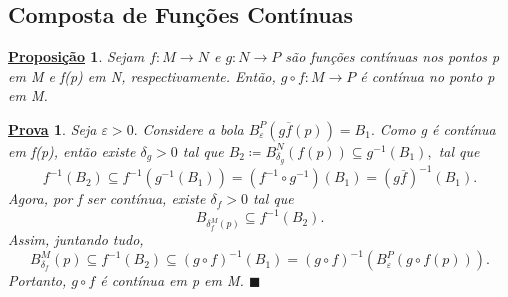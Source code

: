 \documentclass{article}
\newtheorem*{prop*}{\underline{Proposi\c c\~ao}}
\newtheorem*{proof*}{\underline{Prova}}
\renewcommand\qedsymbol{$\blacksquare$}
\begin{document}
\subsection{Composta de Funções Contínuas}
 \begin{prop*}
   Sejam \(f:M\rightarrow N\) e \(g:N\rightarrow P\) são funções contínuas nos pontos p em M e f(p) em N,
respectivamente. Então, \(g\circ{f}:M\rightarrow P\) é contínua no ponto p em M.
 \end{prop*}
 \begin{proof*}
   Seja \(\varepsilon >0.\) Considere a bola \(B_{\varepsilon }^{P}(g\overline{f}(p)) = B_{1}.\) Como g é contínua em f(p), então
existe \(\delta_{g}>0\) tal que \(B_{2}\coloneqq B_{\delta_{g}}^{N}(f(p))\subseteq{g^{-1}(B_{1}),}\) tal que 
  \[
    f^{-1}(B_{2})\subseteq{f^{-1}(g^{-1}(B_{1}))} = (f^{-1}\circ{g^{-1}})(B_{1}) = (g\overline{f})^{-1}(B_{1}).
  \]
  Agora, por f ser contínua, existe \(\delta_{f}>0\) tal que 
  \[
    B_{\delta_{f}^{M}(p)}\subseteq{f^{-1}(B_{2})}.
  \]
  Assim, juntando tudo, 
  \[
    B_{\delta_{f}}^{M}(p)\subseteq{f^{-1}(B_{2})}\subseteq{(g\circ{f})^{-1}(B_{1})} = (g\circ{f})^{-1}(B_{\varepsilon }^{P}(g\circ{f}(p))).
  \]
  Portanto, \(g\circ{f}\) é contínua em p em M. \qedsymbol
 \end{proof*} 
\end{document}
